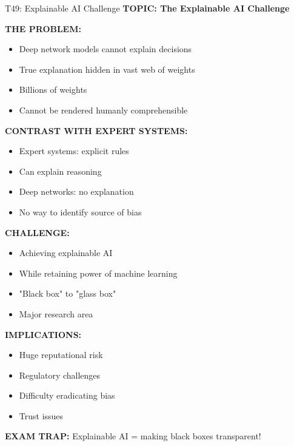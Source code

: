 \documentclass[8pt]{beamer}
\begin{document}
	\begin{frame}{T49: Explainable AI Challenge}
		\fontsize{6.5}{7.5}\selectfont
		\textbf{TOPIC: The Explainable AI Challenge}
		
		\vspace{0.1cm}
		\textbf{THE PROBLEM:}
		\begin{itemize}
			\item Deep network models cannot explain decisions
			\item True explanation hidden in vast web of weights
			\item Billions of weights
			\item Cannot be rendered humanly comprehensible
		\end{itemize}
		
		\vspace{0.1cm}
		\textbf{CONTRAST WITH EXPERT SYSTEMS:}
		\begin{itemize}
			\item Expert systems: explicit rules
			\item Can explain reasoning
			\item Deep networks: no explanation
			\item No way to identify source of bias
		\end{itemize}
		
		\vspace{0.1cm}
		\textbf{CHALLENGE:}
		\begin{itemize}
			\item Achieving explainable AI
			\item While retaining power of machine learning
			\item "Black box" to "glass box"
			\item Major research area
		\end{itemize}
		
		\vspace{0.1cm}
		\textbf{IMPLICATIONS:}
		\begin{itemize}
			\item Huge reputational risk
			\item Regulatory challenges
			\item Difficulty eradicating bias
			\item Trust issues
		\end{itemize}
		
		\textcolor{myred}{\textbf{EXAM TRAP:}} Explainable AI = \textcolor{myblue}{making black boxes transparent}!
	\end{frame}
	
\end{document}
